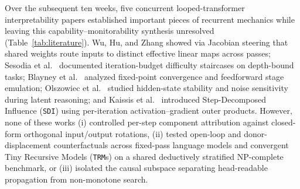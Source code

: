 \documentclass[10pt,letterpaper]{article}
\begin{document}
Over the subsequent ten weeks, five concurrent looped-transformer interpretability papers established important pieces of recurrent mechanics while leaving this capability--monitorability synthesis unresolved (Table~\ref{tab:literature}). Wu, Hu, and Zhang \cite{wu2026shared} showed via Jacobian steering that shared weights route inputs to distinct effective linear maps across passes; Sesodia et al.\ \cite{sesodia2026inside} documented iteration-budget difficulty staircases on depth-bound tasks; Blayney et al.\ \cite{blayney2026mechanistic} analyzed fixed-point convergence and feedforward stage emulation; Olszowiec et al.\ \cite{olszowiec2026monitoring} studied hidden-state stability and noise sensitivity during latent reasoning; and Kaissis et al.\ \cite{kaissis2026sdi} introduced Step-Decomposed Influence (\texttt{SDI}) using per-iteration activation--gradient outer products. However, none of these works (i) controlled per-step component attribution against closed-form orthogonal input/output rotations, (ii) tested open-loop and donor-displacement counterfactuals across fixed-pass language models and convergent Tiny Recursive Models (\texttt{TRM}s) on a shared deductively stratified NP-complete benchmark, or (iii) isolated the causal subspace separating head-readable propagation from non-monotone search.
\end{document}
